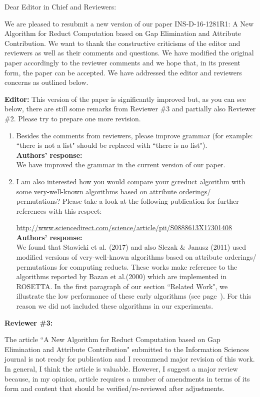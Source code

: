 \documentclass{letter}
\begin{document}
\begin{letter}{}
  \opening{Dear Editor in Chief and Reviewers:}

  We are pleased to resubmit a new version of our paper INS-D-16-1281R1: A New Algorithm for Reduct Computation based on Gap Elimination and Attribute Contribution. We want to thank the constructive criticisms of the editor and reviewers as well as their comments and questions. We have modified the original paper accordingly to the reviewer comments and we hope that, in its present form, the paper can be accepted. We have addressed the editor and reviewers concerns as outlined below.

  \textbf{Editor:} 
  This version of the paper is significantly improved but, as you can see below, there are still some remarks from Reviewer \#3 and partially also Reviewer \#2. Please try to prepare one more revision.
  \begin{enumerate}
	\item Besides the comments from reviewers, please improve grammar (for example: ``there is not a list" should be replaced with ``there is no list"). \\
	\textbf{Authors’ response:} \\
	We have improved the grammar in the current version of our paper.
		 
	\item I am also interested how you would compare your gcreduct algorithm with some very-well-known algorithms based on attribute orderings/ permutations? Please take a look at the following publication for further references with this respect:
  
	\small{\url{ http://www.sciencedirect.com/science/article/pii/S0888613X17301408}}\\
	\normalsize
	\textbf{Authors’ response:} \\
	We found that Stawicki et al. (2017) and also Slezak \& Janusz (2011) used modified versions of very-well-known algorithms based on attribute orderings/ permutations for computing reducts. These works make reference to the algorithms reported by Bazan et al.(2000) which are implemented in ROSETTA. In the first paragraph of our section ``Related Work", we illustrate the low performance of these early algorithms (see page~\pageref{early}). For this reason we did not included these algorithms in our experiments.
  \end{enumerate}
  
  \textbf{Reviewer \#3:}
  
  The article ``A New Algorithm for Reduct Computation based on Gap Elimination and Attribute Contribution" submitted to the Information Sciences journal is not ready for publication and I recommend major revision of this work. In general, I think the article is valuable. However, I suggest a major review because, in my opinion, article requires a number of amendments in terms of its form and content that should be verified/re-reviewed after adjustments.
 

\end{letter}
\end{document}
